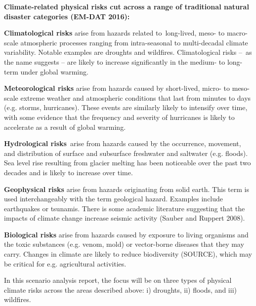 \documentclass[10pt,table,a4]{article}\usepackage[]{graphicx}\usepackage[]{color}
\begin{document}
	
	\begin{multicols}{2}
		\textbf{Climate-related physical risks cut across a range of traditional natural disaster categories (EM-DAT 2016):}
		
		\textbf{Climatological risks} arise from hazards related to long-lived, meso- to macro-scale atmospheric processes ranging from intra-seasonal to multi-decadal climate variability. Notable examples are droughts and wildfires. Climatological risks – as the name suggests – are likely to increase significantly in the medium- to long-term under global warming.
		
		\textbf{Meteorological risks} arise from hazards caused by short-lived, micro- to meso-scale extreme weather and atmospheric conditions that last from minutes to days (e.g. storms, hurricanes). These events are similarly likely to intensify over time, with some evidence that the frequency and severity of hurricanes is likely to accelerate as a result of global warming.
		
		\textbf{Hydrological risks} arise from hazards caused by the occurrence, movement, and distribution of surface and subsurface freshwater and saltwater (e.g. floods). Sea level rise resulting from glacier melting has been noticeable over the past two decades and is likely to increase over time.
		
		\textbf{Geophysical risks} arise from hazards originating from solid earth. This term is used interchangeably with the term geological hazard. Examples include earthquakes or tsunamis. There is some academic literature suggesting that the impacts of climate change increase seismic activity (Sauber and Ruppert 2008).
		
		\textbf{Biological risks} arise from hazards caused by exposure to living organisms and the toxic substances (e.g. venom, mold) or vector-borne diseases that they may carry. Changes in climate are likely to reduce biodiversity (SOURCE), which may be critical for e.g. agricultural activities.
		
		In this scenario analysis report, the focus will be on three types of physical climate risks across the areas described above: i) droughts, ii) floods, and iii) wildfires.
		
		
	\end{multicols}
\end{document}
